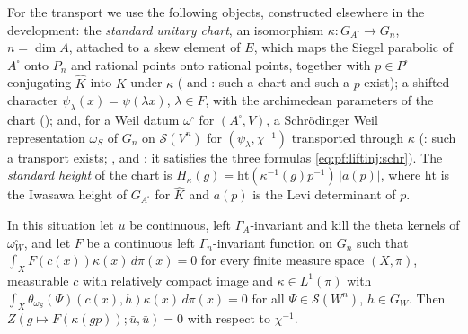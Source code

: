 For the transport we use the following objects, constructed elsewhere in the development: the \emph{standard unitary chart}, an isomorphism
$\kappa:G_{A^\square}\to G_n$, $n=\dim A$, attached to a skew element of $E$, which maps the Siegel parabolic of $A^\square$ onto $P_n$ and rational
points onto rational points, together with $p\in P^\square$ conjugating $\hat K$ into $K$ under $\kappa$
( and :
such a chart and such a $p$ exist); a shifted character $\psi_\lambda(x)=\psi(\lambda x)$, $\lambda\in F$, with the archimedean parameters of the
chart (); and, for a Weil datum $\omega^\square$ for $(A^\square,V)$, a
Schr\"odinger Weil representation $\omega_S$ of $G_n$ on $\mathcal S(V^n)$ for $(\psi_\lambda,\chi^{-1})$ transported through $\kappa$
(: such a transport exists;
, 
and : it satisfies the three formulas \eqref{eq:pf:liftinj:schr}). The
\emph{standard height} of the chart is $H_\kappa(g)=\mathrm{ht}(\kappa^{-1}(g)p^{-1})\,|a(p)|$, where $\mathrm{ht}$ is the Iwasawa height of
$G_{A^\square}$ for $\hat K$ and $a(p)$ is the Levi determinant of $p$.

\begin{lemma}\label{pf:liftinj:K4}
In this situation let $u$ be continuous, left $\Gamma_A$-invariant and kill the theta kernels of $\omega^\square_W$, and let $F$ be a
continuous left $\Gamma_n$-invariant function on $G_n$ such that $\int_XF(c(x))\kappa(x)\,d\pi(x)=0$ for every finite measure space
$(X,\pi)$, measurable $c$ with relatively compact image and $\kappa\in L^1(\pi)$ with
$\int_X\theta_{\omega_S}(\Psi)(c(x),h)\kappa(x)\,d\pi(x)=0$ for all $\Psi\in\mathcal S(W^n)$, $h\in G_W$. Then
$Z(g\mapsto F(\kappa(gp));\bar u,\bar u)=0$ with respect to $\chi^{-1}$.
\end{lemma}

